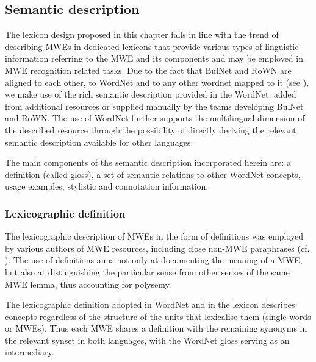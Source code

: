 \documentclass[output=paper,colorlinks,citecolor=brown]{langscibook}
\begin{document}
\subsection{Semantic description} 

The lexicon design proposed in this chapter falls in line with the trend of describing MWEs in %
dedicated lexicons that provide various types of linguistic information referring to the MWE and its components and may be employed in MWE recognition related tasks. Due to the fact that BulNet and RoWN are aligned to each other, to WordNet and to any other wordnet mapped to it (see ), we  make use of the rich semantic description provided in the WordNet, added from additional resources or supplied manually by the teams developing BulNet and RoWN. The use of WordNet further supports the multilingual dimension of the described resource through the possibility of directly deriving the relevant semantic description available for other languages. 

The main components of the semantic description incorporated herein are: a definition (called gloss), a set of semantic relations to other WordNet concepts, usage examples, stylistic and connotation information. 

\subsubsection{Lexicographic definition}

The lexicographic description of MWEs in the form of definitions was employed by various authors of MWE resources, including close non-MWE paraphrases (cf. ). The use of definitions aims not only at documenting the meaning of a MWE, but also at distinguishing the particular sense from other senses of the same MWE lemma, thus accounting for polysemy. %

The lexicographic definition adopted in WordNet and in the lexicon describes concepts regardless of the structure of the units that lexicalise them (single words or MWEs). Thus each MWE shares a definition with the remaining synonyms in the relevant synset in both languages, with the WordNet gloss serving as an intermediary.
\end{document}
